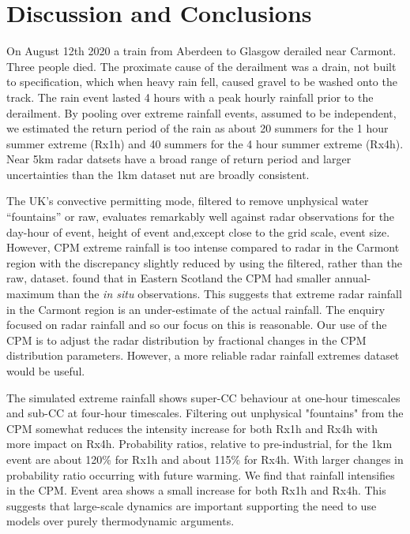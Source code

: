 \documentclass[11pt,a4paper]{article}
\begin{document}
\section{Discussion and Conclusions}
On August 12th 2020 a train from Aberdeen to Glasgow derailed near Carmont. Three people died. The proximate cause of the derailment was a drain, not built to specification, which when heavy rain fell, caused gravel  to be washed onto the track\parencite{carmontReport2024}. The rain event lasted 4 hours with a peak hourly rainfall prior to the derailment. By pooling over extreme rainfall events, assumed to be independent, we  estimated the return period of the rain  as about 20 summers for the 1 hour summer extreme (Rx1h) and  40 summers for the 4 hour summer extreme (Rx4h). Near 5km radar datsets have a broad range of return period and larger uncertainties than the 1km dataset nut are broadly consistent. 

The UK's convective permitting mode\parencite{kendon2023uk_cpm}, filtered to remove unphysical water ``fountains'' or raw, evaluates remarkably well against radar observations for the day-hour of  event, height of event and,except close to the grid scale, event size. However, CPM extreme rainfall is too intense compared to radar in the Carmont region with the discrepancy slightly reduced by using the filtered, rather than the raw,  dataset.  \cite{kendon2023uk_cpm} found that in Eastern Scotland the CPM had smaller annual-maximum than the \textit{in situ} observations. This suggests that extreme radar rainfall  in the Carmont region is an under-estimate of the actual rainfall.  The enquiry  focused on radar rainfall \parencite{carmontReport2024} and so our focus on this is reasonable. Our use of the CPM is to adjust the radar distribution by fractional changes in the CPM distribution parameters. However, a more reliable radar rainfall extremes dataset would be useful. 


The simulated extreme rainfall shows super-CC behaviour at one-hour timescales and sub-CC at four-hour timescales. Filtering out unphysical "fountains" from the CPM somewhat reduces the intensity increase for both Rx1h and Rx4h with more impact on Rx4h.  Probability ratios, relative to pre-industrial, for the 1km event are about 120\% for Rx1h and about 115\%  for Rx4h.  With larger changes in probability ratio occurring with future warming. We find that rainfall intensifies in the CPM. Event area shows a small increase for  both Rx1h and Rx4h.  This suggests that large-scale dynamics are important supporting the need to use models over purely thermodynamic arguments.  
 
\end{document}
